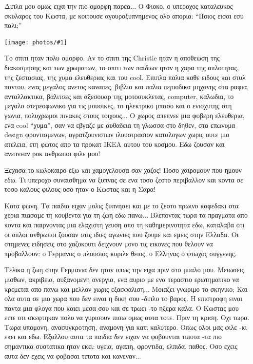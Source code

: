 \documentclass[11pt, letterpaper]{book}
\newcommand\photo[1]{\begin{center}\noindent\texttt{[image: photos/\#1]}\end{center}}
\begin{document}
Διπλα μου ομως ειχα την πιο ομορφη παρεα... Ο Φιοκο, ο υπεροχος καταλευκος σκυλαρος του Κωστα, με κοιτουσε αγουροξυπνημενος ολο απορια: ``Ποιος εισαι εσυ παλι;''

\photo{125.jpg}

Το σπιτι ηταν πολυ ομορφο. Αν το σπιτι της Christie ηταν η αποθεωση της διακοσμησης και των χρωματων, το σπιτι των παιδιων ηταν η χαρα της απλοτητας, της ζεστασιας, της χυμα ελευθεριας και του cool. 
Επιπλα παλια καθε ειδους και στυλ παντου, ενας μεγαλος ανετος καναπες, βιβλια και παλια περιοδικα μηχανης στα ραφια, ανταλλακτικα, βαλιτσες και αξεσουαρ της μοτοσυκλετας, computer, καλωδια, το μεγαλο στερεοφωνικο για τις μουσικες, το ηλεκτρικο μπασο και ο ενισχυτης στη γωνια, πολυχρωμοι πινακες στους τοιχους... 
Ο χωρος απεπνεε μια φοβερη ελευθερια, ενα cool ``χυμα'', σαν να εβγαζε με αυθαδεια τη γλωσσα στο δηθεν, στα επωνυμα design φροντισμενων, αγρατζουνιστων ιλουστρασιον καταλογων χωρις ουτε μια ατελεια, ετη φωτος απο τα προκατ ΙΚΕΑ αυτου του κοσμου. Εδω ζουσαν και ανεπνεαν ροκ ανθρωποι φιλε μου!

Ξεχασα το κωλοκαιρο εξω και χαμογελουσα σαν χαζος! Ποσο χαιρομουν που ημουν εδω. Τι υπεροχο συναισθημα να ξυπνας σε ενα τοσο ζεστο περιβαλλον και κοντα σε τοσο καλους φιλους οσο ηταν ο Κωστας και η Σαρα! 

Κατα φωνη. Tα παιδια ειχαν μολις ξυπνησει και με το ζεστο πρωινο καφεδακι στα χερια πιασαμε τη κουβεντα για τη ζωη εδω πανω... 
Βλεποντας τωρα τα πραγματα απο κοντα και παιρνοντας μια ελαχιστη γευση απο τη καθημερινοτητα εδω, καταλαβα οτι οι απλοι ανθρωποι ζουσαν στις ιδιες αγωνιες που ζουμε και εμεις στην Ελλαδα. Οι στημενες ειδησεις στο χαζοκουτι δειχνουν μονο τις εικονες που θελουν να προβαλλουν: ο Γερμανος ο πλουσιος κυριλε θειος, ο Ελληνας ο φτωχος συγγενης. 

Τελικα η ζωη στην Γερμανια δεν ηταν οπως την ειχα πριν στο μυαλο μου. 
Μειωσεις μισθων, ακριβεια, αυξανομενη ανεργια, ενα αυριο με ενα τεραστιο ερωτηματικο να κρεμεται απο πανω και μελλον χωρις εξασφαλιση... Μοιαζει γνωριμο το σκηνικο; 
Και ολα αυτα σε μια χωρα που δεν ειναι η δικη σου -διπλο το βαρος. Η επιστροφη ειναι παντα μια φλογα που καιει μεσα σου και σε τρωει -το ηξερα καλα. Ο Κωστας μου ειπε οτι σκεφτηκαν πολυ να γυρισουν πισω ομως αυτα τοτε. Πριν τη κριση. Οχι τωρα. 
Τωρα υπομονη, ανασυγκροτηση, αναμονη για κατι καλυτερο. Οπως ολοι μας φιλε -κι εκει και εδω. 
Εξαλλου αυτα τα παιδια δεν ειχαν να φοβουνται τιποτα -τα πιο σημαντικα συστατικα ηταν εκει: υγεια, αγαπη, φροντιδα, ελπιδα, παθος. Οσο εχεις αυτα δεν εχεις να φοβασαι τιποτα και κανεναν...
\end{document}
